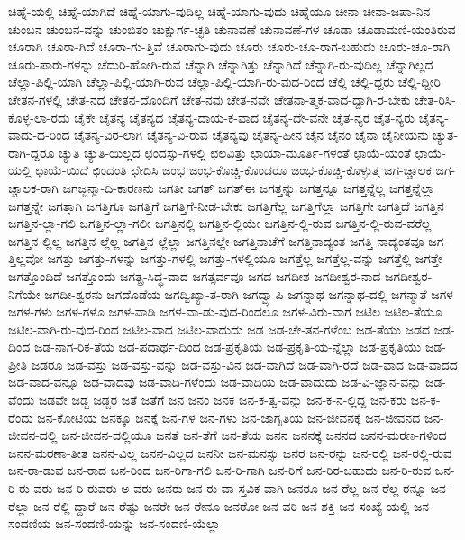 {ಚಿಹ್ನೆ-ಯಲ್ಲಿ
ಚಿಹ್ನೆ-ಯಾಗಿದೆ
ಚಿಹ್ನೆ-ಯಾಗು-ವುದಿಲ್ಲ
ಚಿಹ್ನೆ-ಯಾಗು-ವುದು
ಚಿಹ್ನೆಯೂ
ಚೀನಾ
ಚೀನಾ-ಜಪಾ-ನಿನ
ಚುಂಬನ
ಚುಂಬನ-ವನ್ನು
ಚುಂಬಿತಂ
ಚುಕ್ಷುರ್ಗ-ಚ್ಛತಿ
ಚುನಾವಣೆ
ಚುನಾವಣೆ-ಗಳ
ಚೂಡಾ
ಚೂಡಾಮಣಿ-ಯಂತಿರುವ
ಚೂರಾಗಿ
ಚೂರಾ-ಗಿದೆ
ಚೂರಾ-ಗು-ತ್ತಿವೆ
ಚೂರಾಗು-ವುದು
ಚೂರು
ಚೂರು-ಚೂ-ರಾಗ-ಬಹುದು
ಚೂರು-ಚೂ-ರಾಗಿ
ಚೂರು-ಪಾರು-ಗಳನ್ನು
ಚೆದುರಿ-ಹೋಗಿ-ರುವ
ಚೆನ್ನಾಗಿ
ಚೆನ್ನಾಗಿತ್ತು
ಚೆನ್ನಾಗಿದೆ
ಚೆನ್ನಾಗಿ-ರು-ವುದಿಲ್ಲ
ಚೆನ್ನಾಗಿಲ್ಲದ
ಚೆಲ್ಲಾ-ಪಿಲ್ಲಿ-ಯಾಗಿ
ಚೆಲ್ಲಾ-ಪಿಲ್ಲಿ-ಯಾಗಿ-ರುವ
ಚೆಲ್ಲಾ-ಪಿಲ್ಲಿ-ಯಾಗಿ-ರು-ವುದ-ರಿಂದ
ಚೆಲ್ಲಿ
ಚೆಲ್ಲಿ-ದ್ದರು
ಚೆಲ್ಲಿ-ದ್ದೀರಿ
ಚೇತನ-ಗಳಲ್ಲಿ
ಚೇತ-ನದ
ಚೇತನ-ದೊಂದಿಗೆ
ಚೇತ-ನವು
ಚೇತ-ನವೇ
ಚೇತನಾ-ತ್ಮಕ-ವಾದ-ದ್ದಾಗಿ-ರ-ಬೇಕು
ಚೇತ-ರಿಸಿ-ಕೊಳ್ಳ-ಲಾ-ರದು
ಚೈಕೇ
ಚೈತನ್ಯ
ಚೈತನ್ಯದ
ಚೈತನ್ಯ-ದಾಯ-ಕ-ವಾದ
ಚೈತನ್ಯ-ದೇ-ವನೇ
ಚೈತ-ನ್ಯರ
ಚೈತ-ನ್ಯರು
ಚೈತನ್ಯ-ವಾದು-ದ-ರಿಂದ
ಚೈತನ್ಯ-ವಿರ-ಲಾಗಿ
ಚೈತನ್ಯ-ವಿ-ರುವ
ಚೈತನ್ಯವು
ಚೈತನ್ಯ-ಹೀನ
ಚೈನ
ಚೈನಂ
ಚೈನಾ
ಚೈನೀಯನು
ಚ್ಯುತ-ರಾಗಿ-ದ್ದರೂ
ಚ್ಯುತಿ
ಚ್ಯುತಿ-ಯಿಲ್ಲದ
ಛಂದಸ್ಸು-ಗಳಲ್ಲಿ
ಛಲವಿತ್ತು
ಛಾಯಾ-ಮೂರ್ತಿ-ಗಳಂತೆ
ಛಾಯೆ-ಯಂತೆ
ಛಾಯೆ-ಯಲ್ಲಿ
ಛಾಯೆ-ಯಿದೆ
ಛಿಂದಂತಿ
ಛೇದಿಸಿ
ಜಂಭ
ಜಂಭ-ಕೊಚ್ಚಿ-ಕೊಂಡರೂ
ಜಂಭ-ಕೊಚ್ಚಿ-ಕೊಳ್ಳುತ್ತ
ಜಗ-ಚ್ಚಾಲಕ
ಜಗ-ಚ್ಚಾಲಕ-ರಾಗಿ
ಜಗಜ್ಜನ್ಮಾ-ದಿ-ಕಾರಣನು
ಜಗತೀ
ಜಗತ್
ಜಗತ್ಈ
ಜಗತ್ತನ್ನು
ಜಗತ್ತನ್ನೂ
ಜಗತ್ತನ್ನೆಲ್ಲ
ಜಗತ್ತನ್ನೆಲ್ಲಾ
ಜಗತ್ತನ್ನೇ
ಜಗತ್ತಾಗಿ
ಜಗತ್ತಿಗೂ
ಜಗತ್ತಿಗೆ
ಜಗತ್ತಿಗೆ-ನೀಡ-ಬೇಕು
ಜಗತ್ತಿಗೆಲ್ಲ
ಜಗತ್ತಿಗೆಲ್ಲಾ
ಜಗತ್ತಿಗೇ
ಜಗತ್ತಿದೆ
ಜಗತ್ತಿನ
ಜಗತ್ತಿನ-ಲ್ಲಾ-ಗಲಿ
ಜಗತ್ತಿನ-ಲ್ಲಾ-ಗಲೀ
ಜಗತ್ತಿನಲ್ಲಿ
ಜಗತ್ತಿನ-ಲ್ಲಿಯೇ
ಜಗತ್ತಿನ-ಲ್ಲಿ-ರುವ
ಜಗತ್ತಿನ-ಲ್ಲಿ-ರುವ-ವರೆಲ್ಲ
ಜಗತ್ತಿನ-ಲ್ಲಿಲ್ಲ
ಜಗತ್ತಿನ-ಲ್ಲೆಲ್ಲ
ಜಗತ್ತಿನ-ಲ್ಲೆಲ್ಲಾ
ಜಗತ್ತಿನಲ್ಲೇ
ಜಗತ್ತಿನಾಚೆಗೆ
ಜಗತ್ತಿನಾದ್ಯಂತ
ಜಗತ್ತಿ-ನಾದ್ಯಂತವೂ
ಜಗ-ತ್ತಿಲ್ಲವೋ
ಜಗತ್ತು
ಜಗತ್ತು-ಗಳನ್ನು
ಜಗತ್ತು-ಗಳಲ್ಲಿ
ಜಗತ್ತು-ಗಳಲ್ಲಿಯೂ
ಜಗತ್ತೆಲ್ಲ
ಜಗತ್ತೆಲ್ಲ-ವನ್ನು
ಜಗತ್ತೆಲ್ಲಿ
ಜಗತ್ತೇ
ಜಗತ್ತೊಂದಿದೆ
ಜಗತ್ತೊಂದು
ಜಗತ್ಪ್ರ-ಸಿದ್ಧ-ವಾದ
ಜಗತ್ಸರ್ವವೂ
ಜಗದ
ಜಗದೀಶ
ಜಗದೀಶ್ವರ-ನಾದ
ಜಗದೀಶ್ವರ-ನಿಗೆಯೇ
ಜಗದೀ-ಶ್ವರನು
ಜಗದೊಡೆಯ
ಜಗದ್ವಿಖ್ಯಾ-ತ-ರಾಗಿ
ಜಗದ್ವ್ಯಾಪಿ
ಜಗನ್ನಾಥ
ಜಗನ್ನಾಥ-ದಲ್ಲಿ
ಜಗನ್ಮಾತೆ
ಜಗಳ
ಜಗಳ-ಗಳು
ಜಗಳ-ಗಳೂ
ಜಗಳ-ವಾಡಿ
ಜಗಳ-ವಾ-ಡು-ವುದ-ರಿಂದಲೂ
ಜಗಳ-ವಿರು-ವಾಗ
ಜಟಿಲ
ಜಟಿಲ-ತೆಯೂ
ಜಟಿಲ-ವಾಗಿ-ರು-ವುದ-ರಿಂದ
ಜಟಿಲ-ವಾದ
ಜಟಿಲ-ವಾದುದು
ಜಡ
ಜಡ-ಚೇ-ತನ-ಗಳೆಂಬ
ಜಡ-ತೆಯು
ಜಡದ
ಜಡ-ದಿಂದ
ಜಡ-ನಾಗ-ರಿಕ-ತೆಯ
ಜಡ-ಪದಾರ್ಥ-ದಿಂದ
ಜಡ-ಪ್ರಕೃತಿಯ
ಜಡ-ಪ್ರಕೃತಿ-ಯ-ನ್ನೆಲ್ಲಾ
ಜಡ-ಪ್ರಕೃತಿಯು
ಜಡ-ಪ್ರೀತಿ
ಜಡರೂ
ಜಡ-ವಸ್ತು
ಜಡ-ವಸ್ತು-ವನ್ನು
ಜಡ-ವಸ್ತು-ವಿನ
ಜಡ-ವಾಗಿದೆ
ಜಡ-ವಾಗಿ-ರದೆ
ಜಡ-ವಾದ
ಜಡ-ವಾದದ
ಜಡ-ವಾದ-ವನ್ನೂ
ಜಡ-ವಾದವು
ಜಡ-ವಾದಿ-ಗಳೆಂದು
ಜಡ-ವಾದಿಯ
ಜಡ-ವಾದುದು
ಜಡ-ವಿ-ಜ್ಞಾನ-ವನ್ನು
ಜಡ-ವೆಂದು
ಜಡವೇ
ಜಡ್ಜ
ಜಡ್ಜರ
ಜತೆ
ಜತೆಗೆ
ಜನ
ಜನಂ
ಜನಕ
ಜನ-ಕ-ತ್ವ-ವನ್ನು
ಜನ-ಕ-ನ-ಲ್ಲಿದ್ದ
ಜನ-ಕರು
ಜನ-ಕ-ರೆಂದು
ಜನ-ಕೋಟಿಯ
ಜನಕ್ಕೂ
ಜನಕ್ಕೆ
ಜನ-ಗಳ
ಜನ-ಗಳು
ಜನ-ಜಾಗೃತಿಯ
ಜನ-ಜೀವನಕ್ಕೆ
ಜನ-ಜೀವನದ
ಜನ-ಜೀವನ-ದಲ್ಲಿ
ಜನ-ಜೀವನ-ದಲ್ಲಿಯೂ
ಜನತೆ
ಜನ-ತೆಗೆ
ಜನ-ತೆಯ
ಜನನ
ಜನನಕ್ಕೆ
ಜನನದ
ಜನನ-ಮರಣ-ಗಳಿಂದ
ಜನನ-ಮರಣಾ-ತೀತ
ಜನನ-ವಿಲ್ಲ
ಜನನ-ವಿಲ್ಲದ
ಜನನೀ
ಜನ-ಮನಸ್ಸು
ಜನರ
ಜನ-ರನ್ನು
ಜನ-ರಲ್ಲಿ
ಜನ-ರಲ್ಲಿ-ರುವ
ಜನ-ರಾ-ಡುವ
ಜನ-ರಾದ
ಜನ-ರಿಂದ
ಜನ-ರಿಗಾ-ಗಲಿ
ಜನ-ರಿ-ಗಾಗಿ
ಜನ-ರಿಗೆ
ಜನ-ರಿರ-ಬಹುದು
ಜನ-ರಿ-ರುವ
ಜನ-ರಿ-ರು-ವರು
ಜನ-ರಿ-ರುವರು-ಅ-ವರು
ಜನರು
ಜನ-ರು-ವಾ-ಸ್ತವಿಕ-ವಾಗಿ
ಜನರೂ
ಜನ-ರೆಲ್ಲ
ಜನ-ರೆಲ್ಲ-ರನ್ನೂ
ಜನ-ರೆಲ್ಲಾ
ಜನ-ರೆಲ್ಲಿ-ದ್ದಾರೆ
ಜನ-ರೆಷ್ಟು
ಜನರೇ
ಜನ-ರೇನೂ
ಜನರೋ
ಜನ-ವರಿ
ಜನ-ಶಕ್ತಿ
ಜನ-ಸಂಖ್ಯೆ-ಯಲ್ಲಿ
ಜನ-ಸಂದಣಿಯ
ಜನ-ಸಂದಣಿ-ಯನ್ನು
ಜನ-ಸಂದಣಿ-ಯೆಲ್ಲಾ
}
